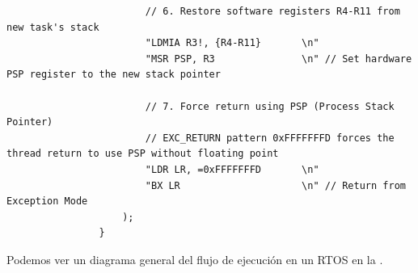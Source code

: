 \documentclass[../main.tex]{subfiles}
\begin{document}
\begin{lstlisting}
                        // 6. Restore software registers R4-R11 from new task's stack
                        "LDMIA R3!, {R4-R11}       \n"
                        "MSR PSP, R3               \n" // Set hardware PSP register to the new stack pointer

                        // 7. Force return using PSP (Process Stack Pointer)
                        // EXC_RETURN pattern 0xFFFFFFFD forces the thread return to use PSP without floating point
                        "LDR LR, =0xFFFFFFFD       \n"
                        "BX LR                     \n" // Return from Exception Mode
                    );
                }      
            \end{lstlisting}

            Podemos ver un diagrama general del flujo de ejecución en un RTOS en la .

\end{document}
